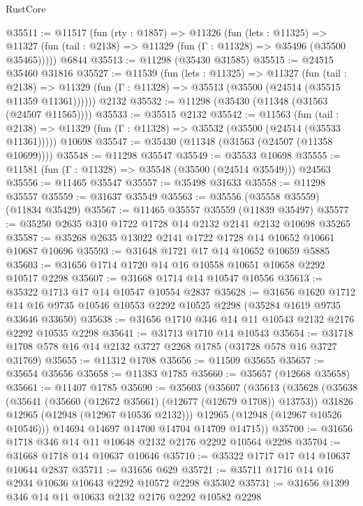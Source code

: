 \begin{lexlean}{RustCore}
\begin{coremodule}
@35511 := @11517
    (fun (rty : @1857) =>
    @11326
      (fun (lets : @11325) =>
      @11327 (fun (tail : @2138) => @11329 (fun (Γ : @11328) => @35496 (@35500 @35465)))))
    @6844
@35513 := @11298 (@35430 @31585)
@35515 := @24515 @35460 @31816
@35527 := @11539
    (fun (lets : @11325) =>
    @11327
      (fun (tail : @2138) =>
      @11329 (fun (Γ : @11328) => @35513 (@35500 (@24514 (@35515 @11359 @11361))))))
    @2132
@35532 := @11298 (@35430 (@11348 (@31563 (@24507 @11565))))
@35533 := @35515 @2132
@35542 := @11563
    (fun (tail : @2138) => @11329 (fun (Γ : @11328) => @35532 (@35500 (@24514 (@35533 @11361)))))
    @10698
@35547 := @35430 (@11348 (@31563 (@24507 (@11358 @10699))))
@35548 := @11298 @35547
@35549 := @35533 @10698
@35555 := @11581 (fun (Γ : @11328) => @35548 (@35500 (@24514 @35549))) @24563
@35556 := @11465 @35547
@35557 := @35498 @31633
@35558 := @11298 @35557
@35559 := @31637 @35549
@35563 := @35556 (@35558 @35559) (@11834 @35429)
@35567 := @11465 @35557 @35559 (@11839 @35497)
@35577 := @35250 @2635 @310 @1722 @1728 @14 @2132 @2141 @2132 @10698 @35265
@35587 := @35268 @2635 @13022 @2141 @1722 @1728 @14 @10652 @10661 @10687 @10696
@35593 := @31648 @1721 @17 @14 @10652 @10659 @5885
@35603 := @31656 @1714 @1720 @14 @16 @10558 @10651 @10658 @2292 @10517 @2298
@35607 := @31668 @1714 @14 @10547 @10556
@35613 := @35322 @1713 @17 @14 @10547 @10554 @2837
@35628 := @31656
    @1620
    @1712
    @14
    @16
    @9735
    @10546
    @10553
    @2292
    @10525
    @2298
    (@35284 @1619 @9735 @33646 @33650)
@35638 := @31656 @1710 @346 @14 @11 @10543 @2132 @2176 @2292 @10535 @2298
@35641 := @31713 @1710 @14 @10543
@35654 := @31718 @1708 @578 @16 @14 @2132 @3727 @2268 @1785 (@31728 @578 @16 @3727 @31769)
@35655 := @11312 @1708
@35656 := @11509 @35655
@35657 := @35654 @35656
@35658 := @11383 @1785
@35660 := @35657 (@12668 @35658)
@35661 := @11407 @1785
@35690 := @35603
    (@35607
      (@35613
        (@35628
          (@35638
            (@35641 (@35660 (@12672 @35661) (@12677 (@12679 @1708)) @13753))
            @31826
            @12965
            (@12948 (@12967 @10536 @2132)))
          @12965
          (@12948 (@12967 @10526 @10546)))
        @14694
        @14697
        @14700
        @14704
        @14709
        @14715))
@35700 := @31656 @1718 @346 @14 @11 @10648 @2132 @2176 @2292 @10564 @2298
@35704 := @31668 @1718 @14 @10637 @10646
@35710 := @35322 @1717 @17 @14 @10637 @10644 @2837
@35711 := @31656 @629
@35721 := @35711 @1716 @14 @16 @2934 @10636 @10643 @2292 @10572 @2298 @35302
@35731 := @31656 @1399 @346 @14 @11 @10633 @2132 @2176 @2292 @10582 @2298

\end{coremodule}
\end{lexlean}
